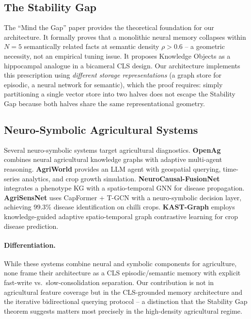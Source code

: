 \documentclass{article}
\begin{document}
\subsection{The Stability Gap}
The ``Mind the Gap'' paper \citep{stabilitygap2026} provides the theoretical
foundation for our architecture. It formally proves that a monolithic neural memory
collapses within $N = 5$ semantically related facts at semantic density $\rho >
0.6$ -- a geometric necessity, not an empirical tuning issue. It proposes
Knowledge Objects as a hippocampal analogue in a bicameral CLS design. Our
architecture implements this prescription using \emph{different storage
representations} (a graph store for episodic, a neural network for semantic), which
the proof requires: simply partitioning a single vector store into two halves does
not escape the Stability Gap because both halves share the same representational
geometry.

\subsection{Neuro-Symbolic Agricultural Systems}
Several neuro-symbolic systems target agricultural diagnostics. \textbf{OpenAg}
\citep{openag2025} combines neural agricultural knowledge graphs with adaptive
multi-agent reasoning. \textbf{AgriWorld} \citep{agriworld2026} provides an LLM
agent with geospatial querying, time-series analytics, and crop growth simulation.
\textbf{NeuroCausal-FusionNet} \citep{neurocausalfusionnet2025} integrates a
phenotype KG with a spatio-temporal GNN for disease propagation. \textbf{AgriSensNet}
\citep{agrisensnet2026} uses CapFormer + T-GCN with a neuro-symbolic decision layer,
achieving 99.3\% disease identification on chilli crops. \textbf{KAST-Graph}
\citep{kastgraph2025} employs knowledge-guided adaptive spatio-temporal graph
contrastive learning for crop disease prediction.

\paragraph{Differentiation.}
While these systems combine neural and symbolic components for agriculture, none
frame their architecture as a CLS episodic/semantic memory with explicit fast-write
vs.\ slow-consolidation separation. Our contribution is not in agricultural feature
coverage but in the CLS-grounded memory architecture and the iterative bidirectional
querying protocol -- a distinction that the Stability Gap theorem suggests matters
most precisely in the high-density agricultural regime.
\end{document}
